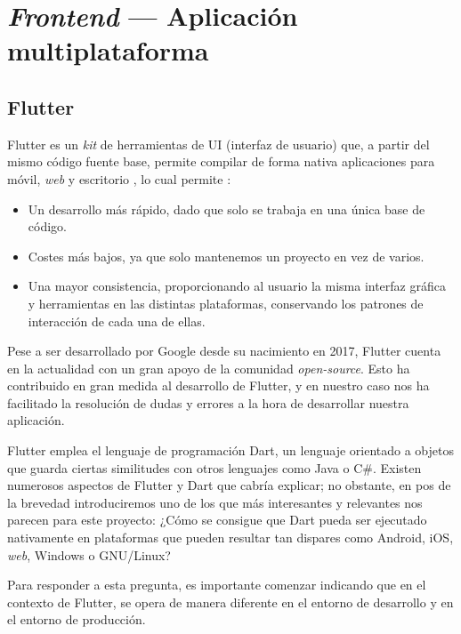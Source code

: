 \section{\emph{Frontend} --- Aplicación multiplataforma} \label{sec:frontend}

\subsection{Flutter}

Flutter es un \emph{kit} de herramientas de UI (interfaz de usuario) que, a partir del mismo código fuente base, permite compilar de forma nativa aplicaciones para móvil, \emph{web} y escritorio \cite{flutter-es}, lo cual permite \cite{miola20}:

\vspace{-0.5cm}
\begin{itemize}
	\item [\textbullet] Un desarrollo más rápido, dado que solo se trabaja en una única base de código.
	\item [\textbullet] Costes más bajos, ya que solo mantenemos un proyecto en vez de varios.
	\item [\textbullet] Una mayor consistencia, proporcionando al usuario la misma interfaz gráfica y herramientas en las distintas plataformas, conservando los patrones de interacción de cada una de ellas.
\end{itemize}

Pese a ser desarrollado por Google desde su nacimiento en 2017, Flutter cuenta en la actualidad con un gran apoyo de la comunidad \emph{open-source}. Esto ha contribuido en gran medida al desarrollo de Flutter, y en nuestro caso nos ha facilitado la resolución de dudas y errores a la hora de desarrollar nuestra aplicación.

Flutter emplea el lenguaje de programación Dart, un lenguaje orientado a objetos que guarda ciertas similitudes con otros lenguajes como Java o C\#. Existen numerosos aspectos de Flutter y Dart que cabría explicar; no obstante, en pos de la brevedad introduciremos uno de los que más interesantes y relevantes nos parecen para este proyecto: ¿Cómo se consigue que Dart pueda ser ejecutado nativamente en plataformas que pueden resultar tan dispares como Android, iOS, \emph{web}, Windows o GNU/Linux?

Para responder a esta pregunta, es importante comenzar indicando que en el contexto de Flutter, se opera de manera diferente en el entorno de desarrollo y en el entorno de producción.

